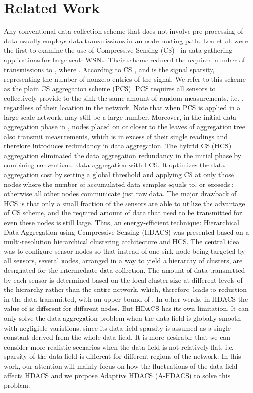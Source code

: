 \documentclass[conference]{IEEEtran}
\begin{document}
\section{Related Work}
Any conventional data collection scheme that does not involve pre-processing of data usually 
employs  data transmissions
in an node routing path. Lou et al. \cite{BalCS} were the first to examine the use of 
Compressive Sensing (CS)~\cite{CS} \cite{CS_Richard} in data gathering applications  
for large scale WSNs. Their scheme reduced the 
required number of transmissions to , where . 
According to CS \cite{CS},   and  is the 
signal sparsity, representing the number of nonzero entries of the signal. 
We refer to this scheme as the plain CS aggregation scheme (PCS). 
PCS requires all sensors to collectively provide to the sink
the same amount of random measurements, i.e. , regardless of their location in the network. 
Note that when PCS is applied in a large scale network,  may still be a large number. 
Moreover, in the initial data aggregation phase in \cite{BalCS}, nodes placed on or closer to the leaves of aggregation tree 
also transmit  measurements, which is in excess of their single readings and therefore introduces redundancy in 
data aggregation.  The hybrid CS (HCS) aggregation \cite{HybridCS1}\cite{HybridCS2} 
eliminated the data aggregation redundancy in the initial phase by combining conventional data aggregation with PCS. 
It optimizes the data aggregation cost by setting a global threshold  and applying CS at only those nodes 
where the number of accumulated data samples equals to, or exceeds ; otherwise all other nodes communicate just raw data. 
The major drawback of HCS is that only a small fraction of the sensors are able to utilize the advantage of CS scheme, 
and the required amount of data that need to be transmitted for even these nodes is still large.
Thus, an energy-efficient technique: Hierarchical Data Aggregation using Compressive Sensing (HDACS) 
\cite{HDACS} was presented based on a multi-resolution hierarchical clustering architecture and HCS. 
The central idea was to configure sensor nodes so that instead of one sink node being targeted by all sensors, several nodes, 
arranged in a way to yield a hierarchy of clusters, are designated for the intermediate data collection. 
The amount of data transmitted by each sensor is determined based on the local cluster size 
at different levels of the hierarchy rather than the entire network, which, therefore, leads to reduction
in the data transmitted, with an upper bound of . In other words, in HDACS the value of  is different for 
different nodes. But HDACS has its own limitation. It can only solve the data aggregation problem when the data field is globally smooth with 
negligible variations, since its data field sparsity is assumed as a single constant  derived from the whole data field. 
It is more desirable that we can consider more realistic scenarios when the data 
field is not relatively flat, i.e. sparsity of the data field is different for different regions of the network. 
In this work, our attention will mainly focus on 
how the fluctuations of the data field affects HDACS and we propose Adaptive HDACS (A-HDACS) to solve this problem.
\end{document}
